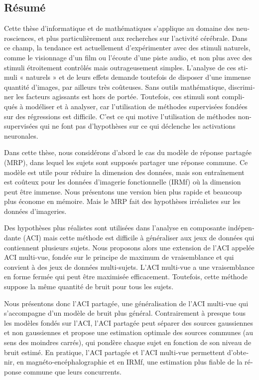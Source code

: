 \begin{otherlanguage}{french}
\chapter*{Résumé}
Cette thèse d'informatique et de mathématiques s'applique au domaine des neurosciences, et plus particulièrement aux recherches sur l'activité cérébrale.
Dans ce champ, la tendance est actuellement d’expérimenter avec des stimuli naturels, comme le visionnage d’un film ou l’écoute d’une piste audio, et non plus avec des stimuli étroitement contrôlés mais outrageusement simples.
L’analyse de ces stimuli « naturels » et de leurs effets demande toutefois de disposer d’une immense quantité d’images, par ailleurs très coûteuses. Sans outils mathématique, discriminer les facteurs agissants est hors de portée. Toutefois, ces stimuli sont compliqués à modéliser et à analyser, car l'utilisation de méthodes supervisées fondées sur des régressions est difficile. C'est ce qui motive l'utilisation de méthodes non-supervisées qui ne font pas d'hypothèses sur ce qui déclenche les activations neuronales.

Dans cette thèse, nous considérons d'abord le cas du modèle de réponse partagée (MRP), dans lequel les sujets sont supposés partager une réponse commune. Ce modèle est utile pour réduire la dimension des données, mais son entraînement est coûteux pour les données d'imagerie fonctionnelle (IRMf) où la dimension peut être immense. Nous présentons une version bien plus rapide et beaucoup plus économe en mémoire. Mais le MRP fait des hypothèses irréalistes sur les données d'imageries.

Des hypothèses plus réalistes sont utilisées dans l'analyse en composante indépendante (ACI) mais cette méthode est difficile à généraliser aux jeux de données qui contiennent plusieurs sujets. Nous proposons alors une extension de l'ACI appelée ACI multi-vue, fondée sur le principe de maximum de vraisemblance
et qui convient à des jeux de données multi-sujets. L’ACI multi-vue a une vraisemblance en forme fermée qui peut être maximisée efficacement. Toutefois, cette méthode suppose la même quantité de bruit pour tous les sujets.

Nous présentons donc l’ACI partagée, une généralisation de l’ACI multi-vue qui s'accompagne d'un modèle de bruit plus général. Contrairement à presque tous les modèles fondés sur l'ACI, l’ACI partagée peut séparer des sources gaussiennes et non gaussiennes et propose une estimation optimale des sources communes (au sens des moindres carrés), qui pondère chaque sujet en fonction de son niveau de bruit estimé. En pratique, l’ACI partagée et l’ACI multi-vue permettent d'obtenir, en magnéto-encéphalographie et en IRMf, une estimation plus fiable de la réponse commune que leurs concurrents.


\end{otherlanguage}
